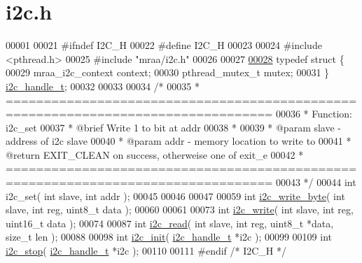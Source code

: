 \hypertarget{i2c_8h_source}{}\section{i2c.\+h}
\label{i2c_8h_source}

\begin{DoxyCode}
00001 
00021 \textcolor{preprocessor}{#ifndef  I2C\_H}
00022 \textcolor{preprocessor}{#define  I2C\_H}
00023 
00024 \textcolor{preprocessor}{#include <pthread.h>}
00025 \textcolor{preprocessor}{#include "mraa/i2c.h"}
00026 
00027 
\hyperlink{structi2c__handle__t}{00028} \textcolor{keyword}{typedef} \textcolor{keyword}{struct }\{
00029    mraa\_i2c\_context context;
00030    pthread\_mutex\_t  mutex;
00031 \} \hyperlink{structi2c__handle__t}{i2c\_handle\_t};
00032 
00033 
00034 \textcolor{comment}{/*}
00035 \textcolor{comment}{ * =================================================================================}
00036 \textcolor{comment}{ * Function:       i2c\_set}
00037 \textcolor{comment}{ * @brief   Write 1 to bit at addr}
00038 \textcolor{comment}{ *}
00039 \textcolor{comment}{ * @param   slave  - address of i2c slave}
00040 \textcolor{comment}{ * @param   addr - memory location to write to}
00041 \textcolor{comment}{ * @return  EXIT\_CLEAN on success, otherweise one of exit\_e}
00042 \textcolor{comment}{ * =================================================================================}
00043 \textcolor{comment}{ */}
00044 \textcolor{keywordtype}{int} i2c\_set( \textcolor{keywordtype}{int} slave, \textcolor{keywordtype}{int} addr );
00045 
00046 
00047 
00059 \textcolor{keywordtype}{int} \hyperlink{i2c_8h_acf2df3bfc71068fc8d551eed2a6e7341}{i2c\_write\_byte}( \textcolor{keywordtype}{int} slave, \textcolor{keywordtype}{int} reg, uint8\_t data );
00060 
00061 
00073 \textcolor{keywordtype}{int} \hyperlink{i2c_8h_a3b5f6dfe9cedb7ea92f9076cfc25c472}{i2c\_write}( \textcolor{keywordtype}{int} slave, \textcolor{keywordtype}{int} reg, uint16\_t data );
00074 
00087 \textcolor{keywordtype}{int} \hyperlink{i2c_8h_aeecccc19faa9d25c282c0341631b7d2f}{i2c\_read}( \textcolor{keywordtype}{int} slave, \textcolor{keywordtype}{int} reg, uint8\_t *data, \textcolor{keywordtype}{size\_t} len );
00088 
00098 \textcolor{keywordtype}{int} \hyperlink{i2c_8h_a1554411301103619aa6f40b7613b5e6b}{i2c\_init}( \hyperlink{structi2c__handle__t}{i2c\_handle\_t} *i2c );
00099 
00109 \textcolor{keywordtype}{int} \hyperlink{i2c_8h_a8f550e69702cca5887035007afe36d40}{i2c\_stop}( \hyperlink{structi2c__handle__t}{i2c\_handle\_t} *i2c );
00110 
00111 \textcolor{preprocessor}{#endif   }\textcolor{comment}{/* I2C\_H */}\textcolor{preprocessor}{}
\end{DoxyCode}
